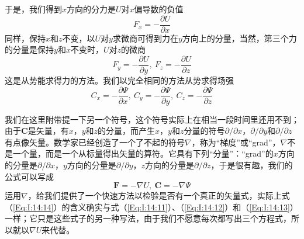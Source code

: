 于是，我们得到$x$方向的分力是$U$对$x$偏导数的负值
\begin{equation}
    \label{Eq:I:14:11}
    F_x=-\frac{\partial U}{\partial x}
\end{equation}
同样，保持$x$和$z$不变，以$U$对$y$求微商可得到力在$y$方向上的分量，当然，第三个力的分量是保持$y$和$x$不变时，$U$对$z$的微商
\begin{equation}
    \label{Eq:I:14:12}
    F_y=-\frac{\partial U}{\partial y},~F_z=-\frac{\partial U}{\partial z}
\end{equation}
这是从势能求得力的方法。我们以完全相同的方法从势求得场强
\begin{equation}
    \label{Eq:I:14:13}
    C_x=-\frac{\partial \varPsi}{\partial x},~C_y=-\frac{\partial \varPsi}{\partial y},~C_z=-\frac{\partial \varPsi}{\partial z}
\end{equation}

我们在这里附带提一下另一个符号，这个符号实际上在相当一段时间里还用不到；由于$\boldsymbol{C}$是矢量，有$x$，$y$和$z$的分量，而产生$x$，$y$和$z$分量的符号$\partial/\partial x$，$\partial/\partial y$和$\partial/\partial z$有点像矢量。数学家已经创造了一个了不起的符号$\nabla$，称为“梯度”或“grad”，$\nabla$不是一个量，而是一个从标量得出矢量的算符。它具有下列“分量”：“grad”的$x$方向的分量是$\partial/\partial x$，$y$方向的分量是$\partial/\partial y$，$z$方向的分量是$\partial/\partial z$，于是很有趣，我们的公式可以写成
\begin{equation}
    \label{Eq:I:14:14}
    \boldsymbol{F} = -\nabla U,~\boldsymbol{C}=-\nabla \varPsi
\end{equation}
运用$\nabla$，给我们提供了一个快速方法以检验是否有一个真正的矢量式，实际上式（\ref{Eq:I:14:14}）的含义确实与式（\ref{Eq:I:14:11}）、（\ref{Eq:I:14:12}）和（\ref{Eq:I:14:13}）一样；它只是这些式子的另一种写法，由于我们不愿意每次都写出三个方程式，所以就以$\nabla U$来代替。

